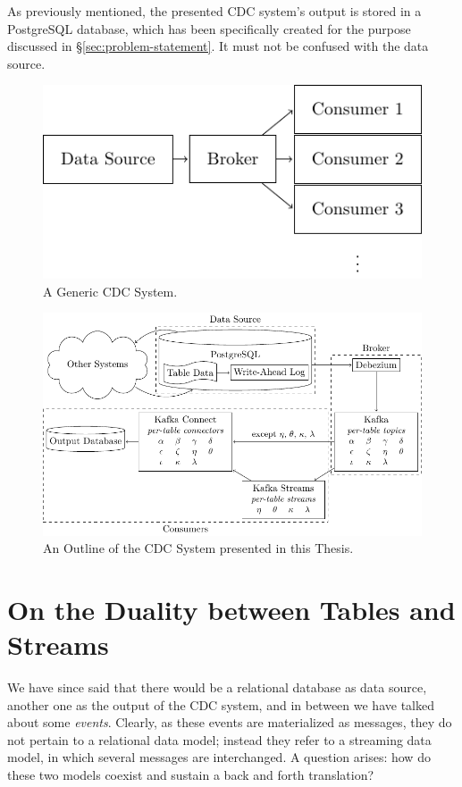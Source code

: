 As previously mentioned, the presented CDC system's output is stored in a PostgreSQL database, which has been specifically created for the purpose discussed in \S \ref{sec:problem-statement}.
It must not be confused with the data source.

\begin{figure}
\centering
\includegraphics[]{figures/introduction/cdc-generic}
\caption{A Generic CDC System.}
\label{fig:cdc-generic}
\end{figure}

\begin{figure}
\centering
\includegraphics[width=\linewidth]{figures/introduction/cdc-complete}
\caption{An Outline of the CDC System presented in this Thesis.}
\label{fig:cdc-complete}
\end{figure}



\section{On the Duality between Tables and Streams}
\label{sec:tables-streams}

We have since said that there would be a relational database as data source, another one as the output of the CDC system, and in between we have talked about some \emph{events}.
Clearly, as these events are materialized as messages, they do not pertain to a relational data model; instead they refer to a streaming data model, in which several messages are interchanged.
A question arises: how do these two models coexist and sustain a back and forth translation?

